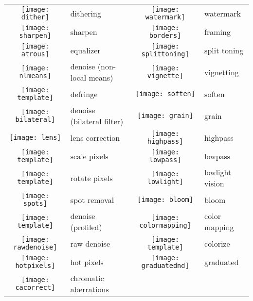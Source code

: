 \documentclass[\ArgLang,\ArgFormat,9pt]{extarticle}
\begin{document}
\begin{multicols}{3}
  \colorbox{keycol}{%
    \begin{tabularx}{\tabwidth}{clcl}
      \texttt{[image: dither]} & dithering                      & \texttt{[image: watermark]} & watermark \\
      \texttt{[image: sharpen]} & sharpen                       & \texttt{[image: borders]} & framing \\
      \texttt{[image: atrous]} & equalizer                      & \texttt{[image: splittoning]} & split toning \\
      \texttt{[image: nlmeans]} & denoise (non-local means)     & \texttt{[image: vignette]} & vignetting \\
      \texttt{[image: template]} & defringe                     & \texttt{[image: soften]} & soften \\
      \texttt{[image: bilateral]} & denoise (bilateral filter)  & \texttt{[image: grain]} & grain \\
      \texttt{[image: lens]} & lens correction                  & \texttt{[image: highpass]} & highpass \\
      \texttt{[image: template]} & scale pixels                 & \texttt{[image: lowpass]} & lowpass \\
      \texttt{[image: template]} & rotate pixels                & \texttt{[image: lowlight]} & lowlight vision \\
      \texttt{[image: spots]} & spot removal                    & \texttt{[image: bloom]} & bloom \\
      \texttt{[image: template]} & denoise (profiled)           & \texttt{[image: colormapping]} & color mapping \\
      \texttt{[image: rawdenoise]} & raw denoise                & \texttt{[image: template]} & colorize \\
      \texttt{[image: hotpixels]} & hot pixels                  & \texttt{[image: graduatednd]} & graduated \\
      \texttt{[image: cacorrect]} & chromatic aberrations
    \end{tabularx}}

\end{multicols}
\end{document}
